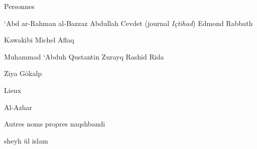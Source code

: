 {Personnes}

`Abd ar-Rahman al-Bazzaz Abdullah Cevdet (journal \emph{Içtihad}) Edmond
Rabbath

Kawakibi Michel Aflaq

Muhammad `Abduh Qustantin Zurayq Rashid Rida

Ziya Gökalp

{Lieux}

Al-Azhar

{Autres noms propres} naqshbandi

sheyh ül islam






 
